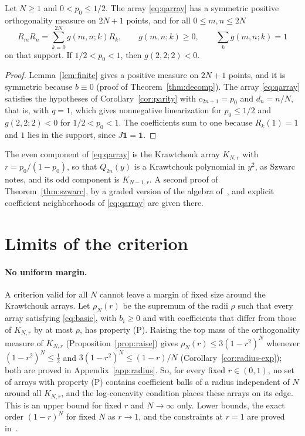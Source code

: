 \begin{theorem}\label{thm:szwarc}
Let $N\geq1$ and $0<p_0\leq1/2$. The array \eqref{eq:qarray} has a symmetric positive orthogonality measure on $2N+1$ points, and for all $0\leq m,n\leq 2N$
\[
R_mR_n=\sum_{k=0}^{2N}g(m,n;k)R_k,\qquad g(m,n;k)\geq0,\qquad\sum_k g(m,n;k)=1
\]
on that support. If $1/2<p_0<1$, then $g(2,2;2)<0$.
\end{theorem}
\begin{proof}
Lemma~\ref{lem:finite} gives a positive measure on $2N+1$ points, and it is symmetric because $b\equiv0$ (proof of Theorem~\ref{thm:decomp}). The array \eqref{eq:qarray} satisfies the hypotheses of Corollary~\ref{cor:parity} with $c_{2n+1}=p_0$ and $d_n=n/N$, that is, with $q=1$, which gives nonnegative linearization for $p_0\leq1/2$ and $g(2,2;2)<0$ for $1/2<p_0<1$. The coefficients sum to one because $R_k(1)=1$ and $1$ lies in the support, since $J\boldsymbol1=\boldsymbol1$.
\end{proof}

The even component of \eqref{eq:qarray} is the Krawtchouk array $K_{N,r}$ with $r=p_0/(1-p_0)$, so that $Q_{2n}(y)$ is a Krawtchouk polynomial in $y^2$, as Szwarc notes, and its odd component is $K_{N-1,r}$. A second proof of Theorem~\ref{thm:szwarc}, by a graded version of the algebra of~\cite{P3}, and explicit coefficient neighborhoods of \eqref{eq:qarray} are given there.

\section{Limits of the criterion}\label{sec:limits}

\paragraph{No uniform margin.} A criterion valid for all $N$ cannot leave a margin of fixed size around the Krawtchouk arrays. Let $\rho_N(r)$ be the supremum of the radii $\rho$ such that every array satisfying \eqref{eq:basic}, with $b_i\geq0$ and with coefficients that differ from those of $K_{N,r}$ by at most $\rho$, has property (P). Raising the top mass of the orthogonality measure of $K_{N,r}$ (Proposition~\ref{prop:raise}) gives $\rho_N(r)\leq3(1-r^2)^N$ whenever $(1-r^2)^N\leq\frac12$ and $3(1-r^2)^N\leq(1-r)/N$ (Corollary~\ref{cor:radius-exp}); both are proved in Appendix~\ref{app:radius}. So, for every fixed $r\in(0,1)$, no set of arrays with property (P) contains coefficient balls of a radius independent of $N$ around all $K_{N,r}$, and the log-concavity condition places these arrays on its edge. This is an upper bound for fixed $r$ and $N\to\infty$ only. Lower bounds, the exact order $(1-r)^N$ for fixed $N$ as $r\to1$, and the constraints at $r=1$ are proved in~\cite{P3}.

